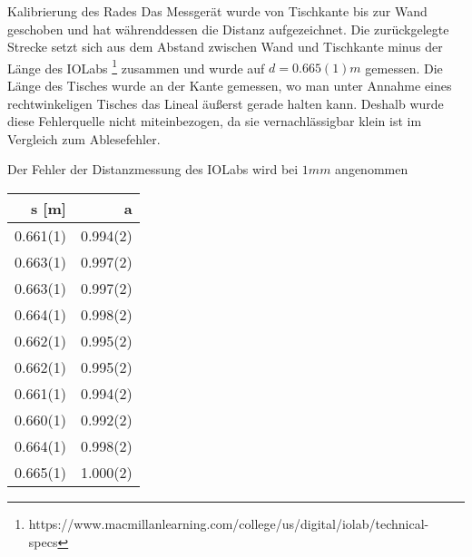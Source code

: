 \documentclass{alex_gp}
\begin{document}
\renewcommand{\labelenumi}{\alph{enumi})}

\begin{mybox}{Kalibrierung des Rades}
	Das Messgerät wurde von Tischkante bis zur Wand geschoben und hat währenddessen die Distanz aufgezeichnet. Die zurückgelegte Strecke setzt sich aus dem Abstand zwischen Wand und Tischkante minus der Länge des IOLabs \footnote{https://www.macmillanlearning.com/college/us/digital/iolab/technical-specs} zusammen und wurde auf \( d = 0.665(1) \unit{m} \) gemessen. Die Länge des Tisches wurde an der Kante gemessen, wo man unter Annahme eines rechtwinkeligen Tisches das Lineal äußerst gerade halten kann. Deshalb wurde diese Fehlerquelle nicht miteinbezogen, da sie vernachlässigbar klein ist im Vergleich zum Ablesefehler.\par 
	Der Fehler der Distanzmessung des IOLabs wird bei \( 1 \unit{mm} \) angenommen
	
	\begin{minipage}{0.35\textwidth}
		\begin{tabular}{@{} rr @{}}\toprule
			s [m] & a \\ \midrule
			0.661(1) & 0.994(2) \\
			0.663(1) & 0.997(2) \\
			0.663(1) & 0.997(2) \\
			0.664(1) & 0.998(2) \\
			0.662(1) & 0.995(2) \\
			0.662(1) & 0.995(2) \\
			0.661(1) & 0.994(2) \\
			0.660(1) & 0.992(2) \\
			0.664(1) & 0.998(2) \\
			0.665(1) & 1.000(2) \\
			\bottomrule
		\end{tabular}
		\label{table:1}
	\end{minipage}
\end{mybox}
\end{document}
